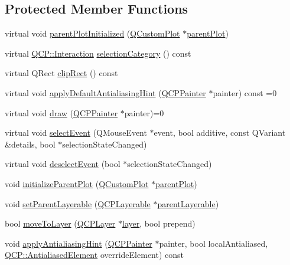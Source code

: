 \subsection*{Protected Member Functions}
\begin{DoxyCompactItemize}
\item 
virtual void \hyperlink{class_q_c_p_layerable_ab20b7dbd8e0249ed61adb9622c427382}{parent\+Plot\+Initialized} (\hyperlink{class_q_custom_plot}{Q\+Custom\+Plot} $\ast$\hyperlink{class_q_c_p_layerable_ab7e0e94461566093d36ffc0f5312b109}{parent\+Plot})
\item 
virtual \hyperlink{namespace_q_c_p_a2ad6bb6281c7c2d593d4277b44c2b037}{Q\+C\+P\+::\+Interaction} \hyperlink{class_q_c_p_layerable_aa4035e586b7f317a06ba7e74e242a5ea}{selection\+Category} () const 
\item 
virtual Q\+Rect \hyperlink{class_q_c_p_layerable_a07a8f746640c3704b09910df297afcba}{clip\+Rect} () const 
\item 
virtual void \hyperlink{class_q_c_p_layerable_afdf83ddc6a265cbf4c89fe99d3d93473}{apply\+Default\+Antialiasing\+Hint} (\hyperlink{class_q_c_p_painter}{Q\+C\+P\+Painter} $\ast$painter) const =0
\item 
virtual void \hyperlink{class_q_c_p_layerable_aecf2f7087482d4b6a78cb2770e5ed12d}{draw} (\hyperlink{class_q_c_p_painter}{Q\+C\+P\+Painter} $\ast$painter)=0
\item 
virtual void \hyperlink{class_q_c_p_layerable_a7498c2d0d081cf7cad0fb3bb93aa0e91}{select\+Event} (Q\+Mouse\+Event $\ast$event, bool additive, const Q\+Variant \&details, bool $\ast$selection\+State\+Changed)
\item 
virtual void \hyperlink{class_q_c_p_layerable_ae546370644a5551c76af739afc008bee}{deselect\+Event} (bool $\ast$selection\+State\+Changed)
\item 
void \hyperlink{class_q_c_p_layerable_a8cbe5a0c9a5674249982f5ca5f8e02bc}{initialize\+Parent\+Plot} (\hyperlink{class_q_custom_plot}{Q\+Custom\+Plot} $\ast$\hyperlink{class_q_c_p_layerable_ab7e0e94461566093d36ffc0f5312b109}{parent\+Plot})
\item 
void \hyperlink{class_q_c_p_layerable_aa23c893671f1f6744ac235cf2204cf3a}{set\+Parent\+Layerable} (\hyperlink{class_q_c_p_layerable}{Q\+C\+P\+Layerable} $\ast$\hyperlink{class_q_c_p_layerable_a98d79f5b716d45eac4347befe546d0ec}{parent\+Layerable})
\item 
bool \hyperlink{class_q_c_p_layerable_af94484cfb7cbbddb7de522e9be71d9a4}{move\+To\+Layer} (\hyperlink{class_q_c_p_layer}{Q\+C\+P\+Layer} $\ast$\hyperlink{class_q_c_p_layerable_aea67e8c19145e70d68c286a36f6b8300}{layer}, bool prepend)
\item 
void \hyperlink{class_q_c_p_layerable_a62bd552d1a45aa9accb24b310542279e}{apply\+Antialiasing\+Hint} (\hyperlink{class_q_c_p_painter}{Q\+C\+P\+Painter} $\ast$painter, bool local\+Antialiased, \hyperlink{namespace_q_c_p_ae55dbe315d41fe80f29ba88100843a0c}{Q\+C\+P\+::\+Antialiased\+Element} override\+Element) const 
\end{DoxyCompactItemize}
